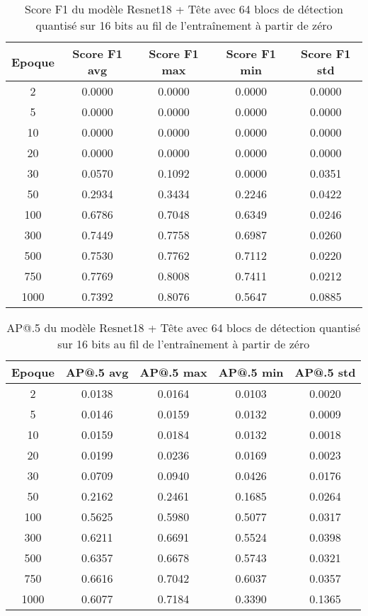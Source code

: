 \begin{table}[!ht]
    \caption{Score F1 du modèle Resnet18 + Tête avec 64 blocs de détection quantisé sur 16 bits au fil de l'entraînement à partir de zéro}
    \label{tab:qresnet18+head_64n_f1score_16b_from_scratch}
    \centering
    \begin{tabular}{ |c||c|c|c|c|  }
        \hline
        \rowcolor{gray!50}
        Epoque & Score F1 avg & Score F1 max & Score F1 min & Score F1 std\\
        \hline
        2 & 0.0000 & 0.0000 & 0.0000 & 0.0000\\
        5 & 0.0000 & 0.0000 & 0.0000 & 0.0000\\
        10 & 0.0000 & 0.0000 & 0.0000 & 0.0000\\
        20 & 0.0000 & 0.0000 & 0.0000 & 0.0000\\
        30 & 0.0570 & 0.1092 & 0.0000 & 0.0351\\
        50 & 0.2934 & 0.3434 & 0.2246 & 0.0422\\
        100 & 0.6786 & 0.7048 & 0.6349 & 0.0246\\
        300 & 0.7449 & 0.7758 & 0.6987 & 0.0260\\
        500 & 0.7530 & 0.7762 & 0.7112 & 0.0220\\
        750 & 0.7769 & 0.8008 & 0.7411 & 0.0212\\
        1000 & 0.7392 & 0.8076 & 0.5647 & 0.0885\\
        \hline
    \end{tabular}
\end{table}

\begin{table}[!ht]
    \caption{AP@.5 du modèle Resnet18 + Tête avec 64 blocs de détection quantisé sur 16 bits au fil de l'entraînement à partir de zéro}
    \label{tab:qresnet18+head_64n_ap50_16b_from_scratch}
    \centering
    \begin{tabular}{ |c||c|c|c|c|  }
        \hline
        \rowcolor{gray!50}
        Epoque & AP@.5 avg & AP@.5 max & AP@.5 min & AP@.5 std\\
        \hline
        2 & 0.0138 & 0.0164 & 0.0103 & 0.0020\\
        5 & 0.0146 & 0.0159 & 0.0132 & 0.0009\\
        10 & 0.0159 & 0.0184 & 0.0132 & 0.0018\\
        20 & 0.0199 & 0.0236 & 0.0169 & 0.0023\\
        30 & 0.0709 & 0.0940 & 0.0426 & 0.0176\\
        50 & 0.2162 & 0.2461 & 0.1685 & 0.0264\\
        100 & 0.5625 & 0.5980 & 0.5077 & 0.0317\\
        300 & 0.6211 & 0.6691 & 0.5524 & 0.0398\\
        500 & 0.6357 & 0.6678 & 0.5743 & 0.0321\\
        750 & 0.6616 & 0.7042 & 0.6037 & 0.0357\\
        1000 & 0.6077 & 0.7184 & 0.3390 & 0.1365\\
        \hline
    \end{tabular}
\end{table}

